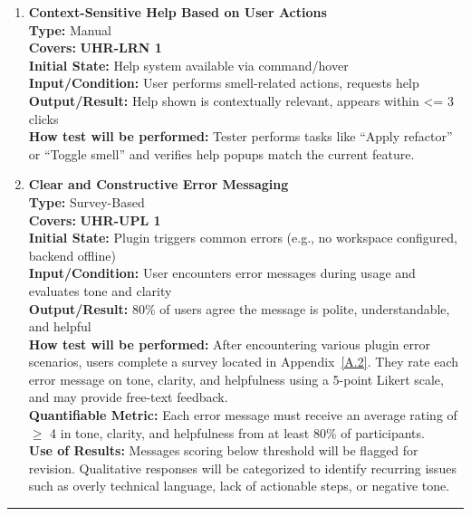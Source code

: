 \documentclass[12pt, titlepage]{article}
\newcommand{\colorrule}{\textcolor{BlueViolet}{\rule{\linewidth}{2pt}}}
\begin{document}
\begin{enumerate}[label={\bf \textcolor{Maroon}{test-UH-\arabic*}}, wide=0pt, font=\itshape]
  \item \textbf{Context-Sensitive Help Based on User Actions} \\[2mm]
    \textbf{Type:} Manual \\
    \textbf{Covers:} \textbf{UHR-LRN 1} \\ 
    \textbf{Initial State:} Help system available via command/hover \\
    \textbf{Input/Condition:} User performs smell-related actions, requests help \\
    \textbf{Output/Result:} Help shown is contextually relevant, appears within \textless= 3 clicks \\[2mm]
    \textbf{How test will be performed:} Tester performs tasks like “Apply refactor” or “Toggle smell” and verifies help popups match the current feature.

    \item \textbf{Clear and Constructive Error Messaging} \\[2mm]
    \textbf{Type:} Survey-Based \\
    \textbf{Covers:} \textbf{UHR-UPL 1} \\ 
    \textbf{Initial State:} Plugin triggers common errors (e.g., no workspace configured, backend offline) \\
    \textbf{Input/Condition:} User encounters error messages during usage and evaluates tone and clarity \\
    \textbf{Output/Result:} 80\% of users agree the message is polite, understandable, and helpful \\[2mm]
    \textbf{How test will be performed:} After encountering various plugin error scenarios, users complete a survey located in Appendix~\ref{A.2}. They rate each error message on tone, clarity, and helpfulness using a 5-point Likert scale, and may provide free-text feedback. \\
    \textbf{Quantifiable Metric:} Each error message must receive an average rating of $\geq$ 4 in tone, clarity, and helpfulness from at least 80\% of participants. \\
    \textbf{Use of Results:} Messages scoring below threshold will be flagged for revision. Qualitative responses will be categorized to identify recurring issues such as overly technical language, lack of actionable steps, or negative tone.

\end{enumerate}


  \noindent
  \textcolor{Blue}{\colorrule}
\end{document}
